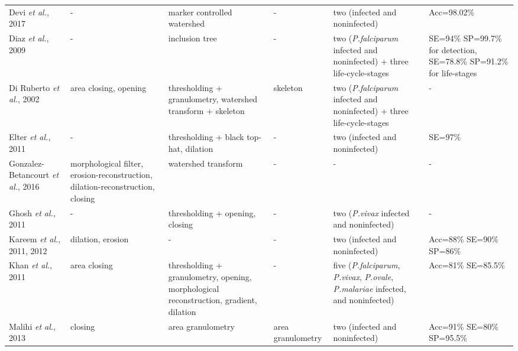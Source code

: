 \begin{longtable}{C{2.1cm} C{2.4cm} C{2.3cm} H C{2.7cm} C{2.2cm} }
	Devi \emph{et al.}, 2017 &
	- &
	marker controlled watershed &	
	- &
	two (infected and noninfected)  &
	Acc=98.02\%
	\vspace{0.6cm}
	\\
	
	Diaz \emph{et al.}, 2009 &
	- &
	inclusion tree &	
	- &
	two (\emph{P.falciparum} infected and noninfected) + three life-cycle-stages &
	SE=94\% SP=99.7\% for detection, SE=78.8\% SP=91.2\% for life-stages
	\vspace{0.6cm}
	\\
	
	Di Ruberto \emph{et al.}, 2002 &
	area closing, opening &
	thresholding + granulometry, watershed  transform + skeleton &	
	skeleton &
	two (\emph{P.falciparum} infected and noninfected) + three life-cycle-stages &
	-
	\vspace{0.6cm}
	\\
	
	Elter \emph{et al.}, 2011 &
	- &
	thresholding + black top-hat, dilation &	
	- &
	two (infected and noninfected) &
	SE=97\%
	\vspace{0.6cm} \\
	
	Gonzalez-Betancourt \emph{et al.}, 2016  &
	morphological filter, erosion-reconstruction, dilation-reconstruction, closing &
	watershed  transform  &
	- &
	- &
	- \vspace{0.6cm} \\	
	
	Ghosh \emph{et al.}, 2011  &
	- &
	thresholding + opening, closing  &
	- &
	two (\emph{P.vivax} infected and noninfected) &
	- \vspace{0.6cm} \\
	
	Kareem \emph{et al.}, 2011, 2012  &
	dilation, erosion &
	-  &
	- &
	two (infected and noninfected) &
	Acc=88\% SE=90\% SP=86\% \vspace{0.6cm} \\	
	
	Khan \emph{et al.}, 2011  &
	area closing &
	thresholding + granulometry, opening, morphological reconstruction, gradient, dilation &
	- &
	five (\emph{P.falciparum}, \emph{P.vivax}, \emph{P.ovale}, \emph{P.malariae} infected, and noninfected) &
	Acc=81\% SE=85.5\% \vspace{0.6cm} \\	
	
	Malihi \emph{et al.}, 2013  &
	closing &
	area granulometry  &
	area granulometry &
	two (infected and noninfected) &
	Acc=91\% SE=80\% SP=95.5\% \vspace{0.6cm} \\	
	

\end{longtable}
